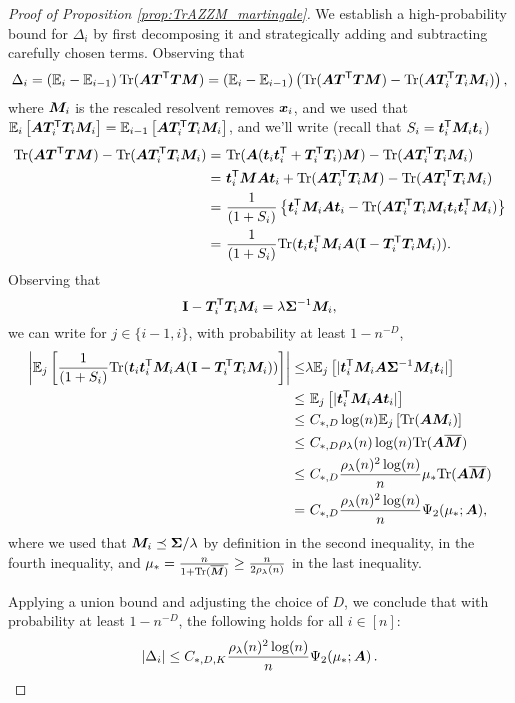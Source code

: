 \begin{proof}[Proof of Proposition \cref{prop:TrAZZM_martingale}]
We establish a high-probability bound for \(\Delta_i\) by first decomposing it and strategically adding and subtracting carefully chosen terms. Observing that
\[
\Delta_i = \left( \E_i - \E_{i-1} \right) \Tr( \bA \bT^\sT \bT \bM) = \left( \E_i - \E_{i-1} \right) \left( \Tr( \bA \bT^\sT \bT \bM) - \Tr( \bA \bT_i^\sT \bT_i \bM_i)\right)  ,
\]
where $\bM_i$ is the rescaled resolvent removes $\bx_i$, and we used that $\E_i\left[\bA\bT_i^\sT \bT_i \bM_i\right] = \E_{i-1}\left[\bA\bT_i^\sT \bT_i \bM_i\right]$, and we'll write (recall that $S_i = \bt_i^\sT \bM_i \bt_i$)
\begin{align*}
    \Tr(\bA \bT^\sT \bT \bM ) -\Tr(\bA \bT_i^\sT \bT_i \bM_i )
    =&~
    \Tr(\bA (\bt_i \bt_i^\sT + \bT_i^\sT \bT_i) \bM ) -\Tr(\bA \bT_i^\sT \bT_i \bM_i )\\
    =&~ 
    \bt_i^\sT \bM \bA\bt_i +   \Tr( \bA \bT_i^\sT \bT_i \bM)
    -\Tr( \bA \bT_i^\sT\bT_i \bM_i)\\
    =&~ 
    \frac1{(1+S_i)} \left\{ \bt_i^\sT \bM_i \bA \bt_i -   \Tr(\bA \bT_i^\sT \bT_i \bM_i \bt_i\bt_i^\sT \bM_i) \right\}\\
    =&~ 
    \frac1{(1+S_i)} \Tr(\bt_i \bt_i^\sT \bM_i \bA (\id - \bT_i^\sT \bT_i \bM_i)).
\end{align*}
Observing that 
\begin{equation*}
  \id - \bT_i^\sT\bT_i \bM_i = \lambda \bSigma^{-1} \bM_i,
\end{equation*}
we can write for $j\in\{i-1,i\}$, with probability at least $1 - n^{-D}$,
\begin{align*}
\left|\E_{j} \left[
\frac1{(1+S_i)} \Tr( \bt_i\bt_i^\sT \bM_i \bA (\id -\bT_i^\sT\bT_i \bM_i ))
\right]\right| 
\le &
\lambda \E_{j} \left[ | \bt_i^\sT \bM_i \bA \bSigma^{-1} \bM_i \bt_i | \right]\\ 
\le&~
\E_{j} \left[ | \bt_i^\sT \bM_i \bA \bt_i | \right]\\
\le&~
C_{*,D}  \log(n) \E_{j} \left[ \Tr(\bA\bM_i) \right]\\
\leq&~ C_{*,D}  \rho_\lambda(n)  \log(n) \Tr(\bA \obM)\\
\leq&~ C_{*,D} \frac{ \rho_\lambda(n)^2  \log(n)}{n} \mu_*\Tr(\bA\obM)\\
=&~ C_{*,D} \frac{ \rho_\lambda(n)^2  \log(n)}{n} \Psi_2 (\mu_* ; \bA),
\end{align*}
where we used that $\bM_i \preceq \bSigma / \lambda$ by definition in the second inequality, \citet[Lemma 4.(b)]{misiakiewicz2024non} in the fourth inequality, and $\mu_* = \frac{n}{1+\Tr(\obM)} \geq \frac{n}{2\rho_\lambda(n)}$ in the last inequality.

Applying a union bound and adjusting the choice of \(D\), we conclude that with probability at least \(1 - n^{-D}\), the following holds for all \(i \in [n]\):
\[
| \Delta_i | \leq C_{*,D,K} \frac{ \rho_\lambda (n)^2 \log (n) }{n} \Psi_2 (\mu_* ; \bA)\,.
\]
\end{proof}

